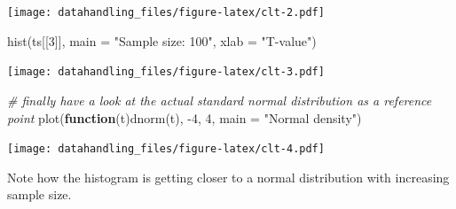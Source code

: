 \documentclass[
  12pt,
]{style/krantz}
\newenvironment{Shaded}{\begin{snugshade}}{\end{snugshade}}
\newcommand{\AttributeTok}[1]{\textcolor[rgb]{0.77,0.63,0.00}{#1}}
\newcommand{\CommentTok}[1]{\textcolor[rgb]{0.56,0.35,0.01}{\textit{#1}}}
\newcommand{\ControlFlowTok}[1]{\textcolor[rgb]{0.13,0.29,0.53}{\textbf{#1}}}
\newcommand{\DecValTok}[1]{\textcolor[rgb]{0.00,0.00,0.81}{#1}}
\newcommand{\FunctionTok}[1]{\textcolor[rgb]{0.00,0.00,0.00}{#1}}
\newcommand{\NormalTok}[1]{#1}
\newcommand{\SpecialCharTok}[1]{\textcolor[rgb]{0.00,0.00,0.00}{#1}}
\newcommand{\StringTok}[1]{\textcolor[rgb]{0.31,0.60,0.02}{#1}}
\begin{document}
\texttt{[image: datahandling\_files/figure-latex/clt-2.pdf]}

\begin{Shaded}
\begin{Highlighting}[]
\FunctionTok{hist}\NormalTok{(ts[[}\DecValTok{3}\NormalTok{]], }\AttributeTok{main =} \StringTok{"Sample size: 100"}\NormalTok{, }\AttributeTok{xlab =} \StringTok{"T{-}value"}\NormalTok{)}
\end{Highlighting}
\end{Shaded}

\texttt{[image: datahandling\_files/figure-latex/clt-3.pdf]}

\begin{Shaded}
\begin{Highlighting}[]
\CommentTok{\# finally have a look at the actual standard normal distribution as a reference point}
\FunctionTok{plot}\NormalTok{(}\ControlFlowTok{function}\NormalTok{(t)}\FunctionTok{dnorm}\NormalTok{(t), }\SpecialCharTok{{-}}\DecValTok{4}\NormalTok{, }\DecValTok{4}\NormalTok{, }\AttributeTok{main =} \StringTok{"Normal density"}\NormalTok{)}
\end{Highlighting}
\end{Shaded}

\texttt{[image: datahandling\_files/figure-latex/clt-4.pdf]}

Note how the histogram is getting closer to a normal distribution with increasing sample size.

  

\backmatter
\printindex
\end{document}
